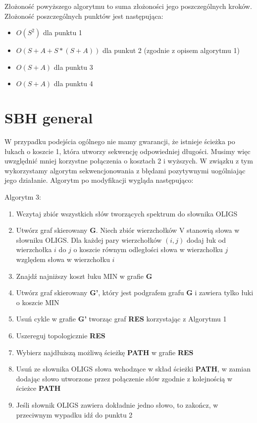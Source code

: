 \documentclass[a4paper,10pt]{article}
\begin{document}
Złożoność powyższego algorytmu to suma złożoności jego poszczególnych kroków. Złożoność poszczególnych punktów jest następująca:
\begin{itemize}
 \item $O(S^2)$ dla punktu 1
 \item $O(S + A + S * (S + A))$ dla punkut 2 (zgodnie z opisem algorytmu 1)
 \item $O(S + A)$ dla punktu 3
 \item $O(S + A)$ dla punktu 4
\end{itemize}

\section{SBH general}
W przypadku podejścia ogólnego nie mamy gwarancji, że istnieje ścieżka po łukach o koszcie 1, która utworzy sekwencję odpowiedniej długości. Musimy więc uwzględnić mniej korzystne połączenia o kosztach 2 i wyższych. W związku z tym wykorzystamy algorytm sekwencjonowania z błędami pozytywnymi uogólniając jego działanie. Algorytm po modyfikacji wygląda następująco:

Algorytm 3:
\begin{enumerate}
 \item Wczytaj zbiór wszystkich słów tworzących spektrum do słownika OLIGS
 \item Utwórz graf skierowany {\bf G}. Niech zbiór wierzchołków V stanowią słowa w słowniku OLIGS. Dla każdej pary wierzchołków $(i,j)$ dodaj łuk od wierzchołka $i$ do $j$ o koszcie równym odległości słowa w wierzchołku $j$ względem słowa w wierzchołku $i$
 \item Znajdź najniższy koszt łuku MIN w grafie {\bf G}
 \item Utwórz graf skierowany {\bf G'}, który jest podgrafem grafu {\bf G} i zawiera tylko łuki o koszcie MIN
 \item Usuń cykle w grafie {\bf G'} tworząc graf {\bf RES} korzystając z Algorytmu 1
 \item Uszereguj topologicznie {\bf RES}
 \item Wybierz najdłuższą możliwą ścieżkę {\bf PATH} w grafie {\bf RES}
 \item Usuń ze słownika OLIGS słowa wchodzące w skład ścieżki {\bf PATH}, w zamian dodając słowo utworzone przez połączenie słów zgodnie z kolejnością w ścieżce {\bf PATH}
 \item Jeśli słownik OLIGS zawiera dokładnie jedno słowo, to zakończ, w przeciwnym wypadku idź do punktu 2
\end{enumerate}
\end{document}
